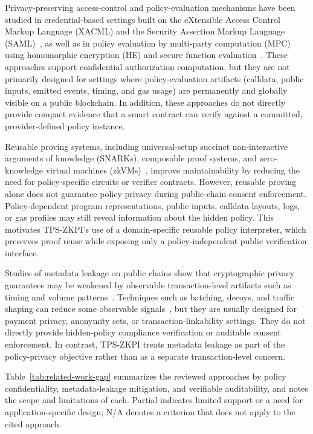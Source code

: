 Privacy-preserving access-control and policy-evaluation mechanisms have been studied in credential-based settings built on the eXtensible Access Control Markup Language (XACML) and the Security Assertion Markup Language (SAML)~\cite{ardagna2009xacml}, as well as in policy evaluation by multi-party computation (MPC) using homomorphic encryption (HE) and secure function evaluation~\cite{sheikhalishahi2019privacy}.
These approaches support confidential authorization computation, but they are not primarily designed for settings where policy-evaluation artifacts (calldata, public inputs, emitted events, timing, and gas usage) are permanently and globally visible on a public blockchain.
In addition, these approaches do not directly provide compact evidence that a smart contract can verify against a committed, provider-defined policy instance.

Reusable proving systems, including universal-setup succinct non-interactive arguments of knowledge (SNARKs), composable proof systems, and zero-knowledge virtual machines (zkVMs)~\cite{gabizon2019plonk,campanelli2019legosnark,liu2025ceno}, improve maintainability by reducing the need for policy-specific circuits or verifier contracts.
However, reusable proving alone does not guarantee policy privacy during public-chain consent enforcement.
Policy-dependent program representations, public inputs, calldata layouts, logs, or gas profiles may still reveal information about the hidden policy.
This motivates TPS-ZKPI's use of a domain-specific reusable policy interpreter, which preserves proof reuse while exposing only a policy-independent public verification interface.

Studies of metadata leakage on public chains show that cryptographic privacy
guarantees may be weakened by observable transaction-level artifacts such as
timing and volume patterns~\cite{beres2021blockchain}. Techniques such as batching,
decoys, and traffic shaping can reduce some observable signals~\cite{miller2023vtbc}, but they are
usually designed for payment privacy, anonymity sets, or transaction-linkability
settings. They do not directly provide hidden-policy compliance verification
or auditable consent enforcement. In contrast, TPS-ZKPI treats metadata leakage as
part of the policy-privacy objective rather than as a separate transaction-level concern.

Table~\ref{tab:related-work-gap} summarizes the reviewed approaches by policy confidentiality, metadata-leakage mitigation, and verifiable auditability, and notes the scope and limitations of each.
Partial indicates limited support or a need for application-specific design;
N/A denotes a criterion that does not apply to the cited approach.


